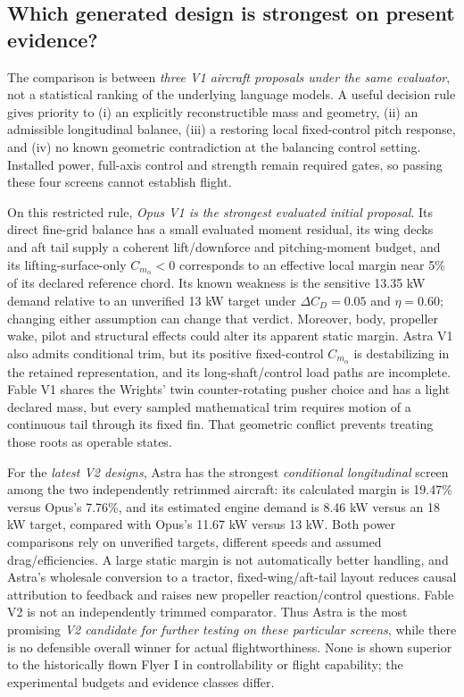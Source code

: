 \documentclass[10pt,letterpaper]{article}
\begin{document}
\subsection{Which generated design is strongest on present evidence?}
The comparison is between \emph{three V1 aircraft proposals under the same evaluator}, not a statistical ranking of the underlying language models. A useful decision rule gives priority to (i) an explicitly reconstructible mass and geometry, (ii) an admissible longitudinal balance, (iii) a restoring local fixed-control pitch response, and (iv) no known geometric contradiction at the balancing control setting. Installed power, full-axis control and strength remain required gates, so passing these four screens cannot establish flight.

On this restricted rule, \emph{Opus V1 is the strongest evaluated initial proposal}. Its direct fine-grid balance has a small evaluated moment residual, its wing decks and aft tail supply a coherent lift/downforce and pitching-moment budget, and its lifting-surface-only $C_{m_\alpha}<0$ corresponds to an effective local margin near 5\% of its declared reference chord. Its known weakness is the sensitive 13.35 kW demand relative to an unverified 13 kW target under $\Delta C_D=0.05$ and $\eta=0.60$; changing either assumption can change that verdict. Moreover, body, propeller wake, pilot and structural effects could alter its apparent static margin. Astra V1 also admits conditional trim, but its positive fixed-control $C_{m_\alpha}$ is destabilizing in the retained representation, and its long-shaft/control load paths are incomplete. Fable V1 shares the Wrights' twin counter-rotating pusher choice and has a light declared mass, but every sampled mathematical trim requires motion of a continuous tail through its fixed fin. That geometric conflict prevents treating those roots as operable states.

For the \emph{latest V2 designs}, Astra has the strongest \emph{conditional longitudinal} screen among the two independently retrimmed aircraft: its calculated margin is 19.47\% versus Opus's 7.76\%, and its estimated engine demand is 8.46 kW versus an 18 kW target, compared with Opus's 11.67 kW versus 13 kW. Both power comparisons rely on unverified targets, different speeds and assumed drag/efficiencies. A large static margin is not automatically better handling, and Astra's wholesale conversion to a tractor, fixed-wing/aft-tail layout reduces causal attribution to feedback and raises new propeller reaction/control questions. Fable V2 is not an independently trimmed comparator. Thus Astra is the most promising \emph{V2 candidate for further testing on these particular screens}, while there is no defensible overall winner for actual flightworthiness. None is shown superior to the historically flown Flyer I in controllability or flight capability; the experimental budgets and evidence classes differ.
\end{document}
